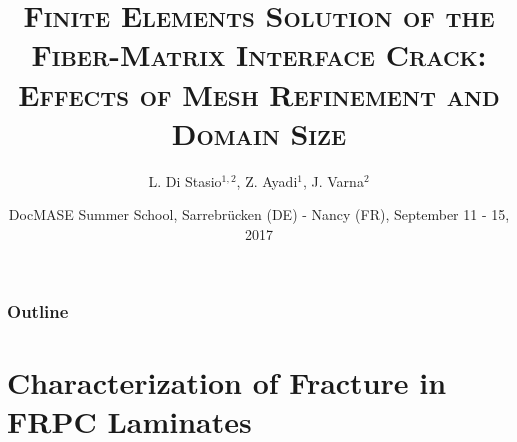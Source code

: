 \documentclass[first,firstsupp,lastsupp,handout,last,hyperref,table]{ETHclass}
\makeatletter
\newenvironment{withoutheadline}{
         \setbeamertemplate{headline}{%
\vspace{35pt}
}
    }{}
\makeatother
\begin{document}

\title[\textsc{FEM \& the Fiber-Matrix Interface Crack}]{\textsc{Finite Elements Solution of the Fiber-Matrix Interface Crack: Effects of Mesh Refinement and Domain Size}}
\author{ L. Di Stasio$^{1,2}$, Z. Ayadi$^{1}$, J. Varna$^{2}$}
\date{DocMASE Summer School, Sarrebr\"ucken (DE) - Nancy (FR), September 11 - 15, 2017}

\begin{frame}[plain]
    \titlepage
\end{frame}

\begin{withoutheadline}
\begin{frame}
\frametitle{Outline}
\justifying
\vspace*{-0.5cm}
\tableofcontents[hidesubsections]
\end{frame}
\end{withoutheadline}



\section[Characterization of Fracture in FRPC]{Characterization of Fracture in FRPC Laminates}
\end{document}
